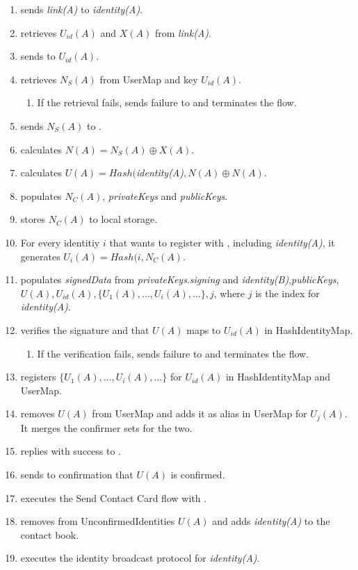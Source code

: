 \documentclass[a4paper,10pt]{article}
\newcommand{\signedData}{\emph{signedData}}
\newcommand{\privateKeys}{\emph{privateKeys}}
\newcommand{\publicKeys}{\emph{publicKeys}}
\newcommand{\signingKey}{\privateKeys{}.\emph{signing}}
\newcommand{\identity}[1]{{\em identity(#1)}}
\newcommand{\link}[1]{{\em link(#1)}}
\begin{document}
\begin{enumerate}
 \item \Client[B] sends \link{A} to \identity{A}.
 \item \Client[A] retrieves $U_{id}(A)$ and $X(A)$ from \link{A}.
 \item \Client[A] sends to \Server{} $U_{id}(A)$.
 \item \Server{} retrieves $N_S(A)$ from UserMap and key $U_{id}(A)$.
 \begin{enumerate}
  \item If the retrieval fails, \Server{} sends failure to \Client[A] and terminates the flow.
 \end{enumerate}
 \item \Server{} sends $N_S(A)$ to \Client[A].
 \item \Client[A] calculates $N(A)=N_S(A)\oplus X(A)$.
 \item \Client[A] calculates $U(A)=Hash($\identity{A}$,N(A)\oplus N(A)$.
 \item \Client[A] populates $N_C(A)$, \privateKeys{} and \publicKeys{}.
 \item \Client[A] stores $N_C(A)$ to local storage.
 \item For every identitiy $i$ that \Client[A] wants to register with \Server{}, including \identity{A}, it generates $U_i(A)=Hash(i,N_C(A)$.
 \item \Client[A] populates \signedData{} from \signingKey{} and \identity{B},\publicKeys{},$U(A),U_{id}(A),\lbrace U_1(A),\ldots,U_i(A),\ldots\rbrace,j$, where $j$ is the index 
for \identity{A}.
 \item \Server{} verifies the signature and that $U(A)$ maps to $U_{id}(A)$ in HashIdentityMap.
 \begin{enumerate}
  \item If the verification fails, \Server{} sends failure to \Client[A] and terminates the flow.
 \end{enumerate}
 \item \Server{} registers $\lbrace U_1(A),\ldots,U_i(A),\ldots\rbrace$ for $U_{id}(A)$ in HashIdentityMap and UserMap.
 \item \Server{} removes $U(A)$ from UserMap and adds it as alias in UserMap for $U_j(A)$. It merges the confirmer sets for the two.
 \item \Server{} replies with success to \Client[A].
 \item \Server{} sends to \Client[B] confirmation that $U(A)$ is confirmed.
 \item \Client[B] executes the Send Contact Card flow with \Client[A].
 \item \Client[B] removes from UnconfirmedIdentities $U(A)$ and adds \identity{A} to the \longProduct{} contact book.
 \item \Client[B] executes the identity broadcast protocol for \identity{A}.
\end{enumerate}
\end{document}
